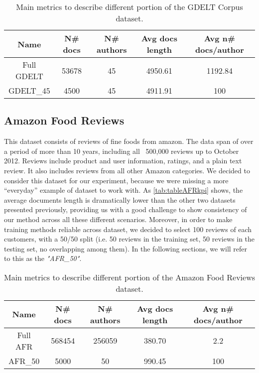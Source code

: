\begin{table}[h!]
	\begin{center}  
		\caption[GDELT Corpus metrics]{Main metrics to describe different portion of the GDELT Corpus dataset.} 
		\label{tab:tableGDELTkpi}
		\begin{tabular}{|c | c | c | c | c |}
			\hline 
			Name & N\# docs & N\# authors & Avg docs length & Avg n\# docs/author \\
			\hline
			Full GDELT & 53678 & 45 & 4950.61 & 1192.84 \\ \hline
			GDELT\_45 & 4500 & 45 & 4911.91 & 100  \\ \hline
		\end{tabular} 
	\end{center}
\end{table}

\subsection{Amazon Food Reviews}
This dataset consists of reviews of fine foods from amazon. The data span of over a period of more than 10 years, including all ~500,000 reviews up to October 2012. Reviews include product and user information, ratings, and a plain text review. It also includes reviews from all other Amazon categories.
We decided to consider this dataset for our experiment, because we were missing a more \enquote{everyday} example of dataset to work with. As \autoref{tab:tableAFRkpi} shows, the average documents length is dramatically lower than the other two datasets presented previously, providing us with a good challenge to show consistency of our method across all these different scenarios.
Moreover, in order to make training methods reliable across dataset, we decided to select 100 reviews of each customers, with a 50/50 split (i.e. 50 reviews in the training set, 50 reviews in the testing set, no overlapping among them). In the following sections, we will refer to this as the \textit{"AFR\_50"}.

\begin{table}[h!]
	\begin{center}  
		\caption[Amazon Food Reviews Corpus metrics]{Main metrics to describe different portion of the Amazon Food Reviews dataset.} 
		\label{tab:tableAFRkpi}
		\begin{tabular}{|c | c | c | c | c |}
			\hline 
			Name & N\# docs & N\# authors & Avg docs length & Avg n\# docs/author \\
			\hline
			Full AFR & 568454 & 256059 & 380.70 & 2.2 \\ \hline
			AFR\_50 & 5000 & 50 & 990.45 & 100  \\ \hline
		\end{tabular} 
	\end{center}
\end{table}

